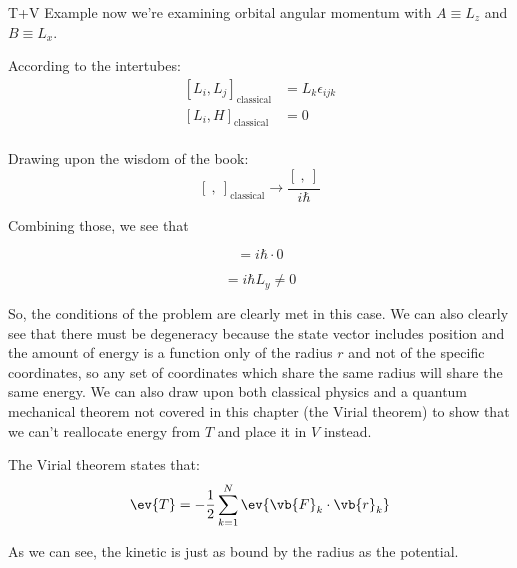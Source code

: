 \begin{answer}
  \begin{answerpart}{T+V Example}
    now we're examining orbital angular momentum with $A \equiv L_z$
    and $B \equiv L_x$.

    According to the intertubes:
    \begin{equation}
      \begin{split}
        [L_i, L_j]_{\text{classical}} &= L_k \epsilon_{ijk}\\
        [L_i, H]_{\text{classical}} &= 0\\
      \end{split}
    \end{equation}

    Drawing upon the wisdom of the book:
    \begin{equation}
      \tag{1.229}
      [\ ,\ ]_{\text{classical}} \rightarrow \frac{[\ ,\ ]_{\text{}}}{i\hbar}
    \end{equation}

    Combining those, we see that

    \begin{equation}
      [L_i, H] = i\hbar \cdot 0
    \end{equation}

    \begin{equation}
      [L_z, L_x] = i\hbar L_y \ne 0
    \end{equation}

    So, the conditions of the problem are clearly met in this case.
    We can also clearly see that there must be degeneracy because the
    state vector includes position and the amount of energy is a
    function only of the radius $r$ and not of the specific
    coordinates, so any set of coordinates which share the same radius
    will share the same energy.  We can also draw upon both classical
    physics and a quantum mechanical theorem not covered in this
    chapter (the Virial theorem) to show that we can't reallocate
    energy from $T$ and place it in $V$ instead.

    The Virial theorem states that:
    \begin{equation}
      \ev{T} = - \frac{1}{2} \sum_{k=1}^{N}\ev{\vb{F}_k \cdot \vb{r}_k}
    \end{equation}

    As we can see, the kinetic is just as bound by the radius as the
    potential.

  \end{answerpart}

\end{answer}
